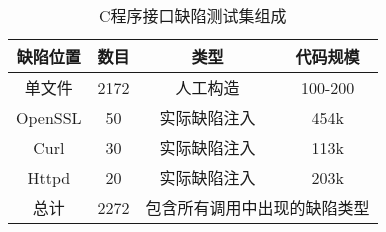 \begin{table}[t]
	\centering
	\begin{minipage}[t]{0.6\linewidth} %
		\caption{C程序接口缺陷测试集组成}
		\label{tab:4-2-dataset}
			\begin{tabular}{cccc}
			\hline
			缺陷位置 & 数目& 类型& 代码规模\\
			\hline
			单文件 & 2172 & 人工构造 & 100-200\\
			OpenSSL & 50 & 实际缺陷注入 & 454k\\
			Curl & 30 & 实际缺陷注入 & 113k\\
			Httpd & 20 & 实际缺陷注入 & 203k\\
			总计 & 2272 & \multicolumn{2}{c}{包含所有调用中出现的缺陷类型} \\
			\hline
		\end{tabular}
	\end{minipage}
\end{table}